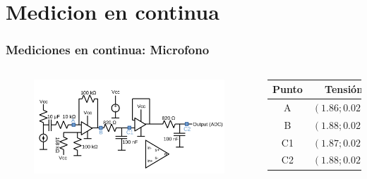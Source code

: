 \section{Medicion en continua}
\begin{frame}
	\frametitle{Mediciones en continua: Microfono}
	\begin{columns}[t]
		\begin{figure}[H]
			\centering
			\includegraphics[scale=0.3]{AmpMic}	
		\end{figure}
		\begin{table}
			\centering
			\begin{tabular}{c|c}
				Punto & Tensión\\
				\hline \hline
				A & $(1.86;0.02)V$  \\
				\hline
				B & $(1.88;0.02)V$\\
				\hline
				C1 & $(1.87;0.02)V$\\
				\hline
				C2 & $(1.88;0.02)V$\\
				\hline
			\end{tabular}
		\end{table}
	\end{columns}
\end{frame}

